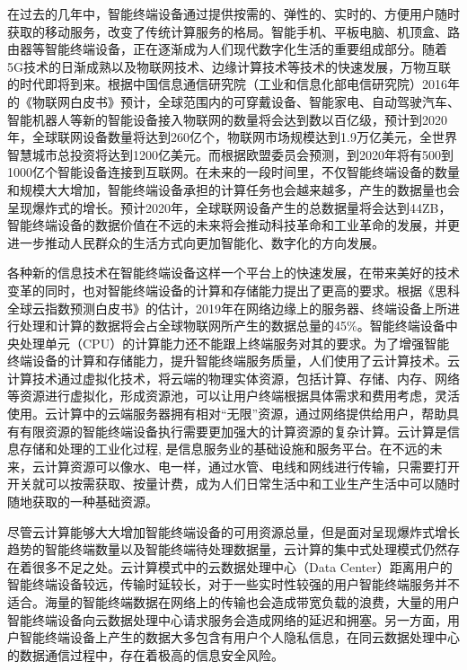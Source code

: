 在过去的几年中，智能终端设备通过提供按需的、弹性的、实时的、方便用户随时获取的移动服务，改变了传统计算服务的格局\citep{施巍松2017边缘计算}。智能手机、平板电脑、机顶盒、路由器等智能终端设备，正在逐渐成为人们现代数字化生活的重要组成部分。随着5G技术的日渐成熟以及物联网技术、边缘计算技术等技术的快速发展，万物互联的时代即将到来\cite{taleb2017mobile}。根据中国信息通信研究院（工业和信息化部电信研究院）2016年的《物联网白皮书》预计，全球范围内的可穿戴设备、智能家电、自动驾驶汽车、智能机器人等新的智能设备接入物联网的数量将会达到数以百亿级，预计到2020年，全球联网设备数量将达到260亿个，物联网市场规模达到1.9万亿美元，全世界智慧城市总投资将达到1200亿美元\citep{物联网白皮书2016}。而根据欧盟委员会预测，到2020年将有500到1000亿个智能设备连接到互联网\cite{sundmaeker2010vision}。在未来的一段时间里，不仅智能终端设备的数量和规模大大增加，智能终端设备承担的计算任务也会越来越多，产生的数据量也会呈现爆炸式的增长。预计2020年，全球联网设备产生的总数据量将会达到44ZB\citep{物联网白皮书2016}，智能终端设备的数据价值在不远的未来将会推动科技革命和工业革命的发展，并更进一步推动人民群众的生活方式向更加智能化、数字化的方向发展。

各种新的信息技术在智能终端设备这样一个平台上的快速发展，在带来美好的技术变革的同时，也对智能终端设备的计算和存储能力提出了更高的要求。根据《思科全球云指数预测白皮书》的估计，2019年在网络边缘上的服务器、终端设备上所进行处理和计算的数据将会占全球物联网所产生的数据总量的45\%\citep{Cisco2016}。智能终端设备中央处理单元（CPU）的计算能力还不能跟上终端服务对其的要求\cite{dinh2013survey,othman2014survey,wang2015survey}。为了增强智能终端设备的计算和存储能力，提升智能终端服务质量，人们使用了云计算技术。云计算技术通过虚拟化技术，将云端的物理实体资源，包括计算、存储、内存、网络等资源进行虚拟化，形成资源池，可以让用户终端根据具体需求和费用考虑，灵活使用。云计算中的云端服务器拥有相对“无限”资源，通过网络提供给用户，帮助具有有限资源的智能终端设备执行需要更加强大的计算资源的复杂计算\citep{Noor.2018}。云计算是信息存储和处理的工业化过程, 是信息服务业的基础设施和服务平台\citep{江绵恒2010}。在不远的未来，云计算资源可以像水、电一样，通过水管、电线和网线进行传输，只需要打开开关就可以按需获取、按量计费，成为人们日常生活中和工业生产生活中可以随时随地获取的一种基础资源\citep{buyya2009cloud}。

尽管云计算能够大大增加智能终端设备的可用资源总量，但是面对呈现爆炸式增长趋势的智能终端数量以及智能终端待处理数据量，云计算的集中式处理模式仍然存在着很多不足之处。云计算模式中的云数据处理中心（Data Center）距离用户的智能终端设备较远，传输时延较长，对于一些实时性较强的用户智能终端服务并不适合。海量的智能终端数据在网络上的传输也会造成带宽负载的浪费，大量的用户智能终端设备向云数据处理中心请求服务会造成网络的延迟和拥塞\citep{ismail2015evaluation}。另一方面，用户智能终端设备上产生的数据大多包含有用户个人隐私信息，在同云数据处理中心的数据通信过程中，存在着极高的信息安全风险。

